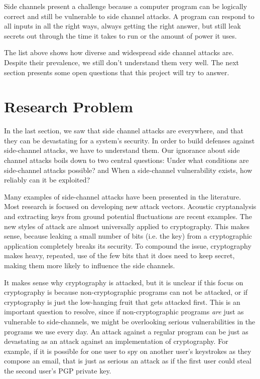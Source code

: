 \documentclass{acm_proc_article-sp}
\begin{document}
Side channels present a challenge because a computer program can be logically
correct and still be vulnerable to side channel attacks. A program can respond
to all inputs in all the right ways, always getting the right answer, but still
leak secrets out through the time it takes to run or the amount of power it
uses.

The list above shows how diverse and widespread side channel attacks are.
Despite their prevalence, we still don't understand them very well. The next
section presents some open questions that this project will try to answer.

\section{Research Problem}
\label{sec:problem}

In the last section, we saw that side channel attacks are everywhere, and that
they can be devastating for a system's security. In order to build defenses
against side-channel attacks, we have to understand them. Our ignorance about
side channel attacks boils down to two central questions: Under what conditions
are side-channel attacks possible? and When a side-channel vulnerability exists,
how reliably can it be exploited?

Many examples of side-channel attacks have been presented in the literature.
Most research is focused on developing new attack vectors. Acoustic
cryptanalysis \cite{genkin2013rsa} and extracting keys from ground potential
fluctuations \cite{genkin2014get} are recent examples. The new styles of attack
are almost universally applied to cryptography. This makes sense, because
leaking a small number of bits (i.e. the key) from a cryptographic application
completely breaks its security. To compound the issue, cryptography makes heavy,
repeated, use of the few bits that it does need to keep secret, making them more
likely to influence the side channels.

It makes sense why cryptography is attacked, but it is unclear if this focus on
cryptography is because non-cryptographic programs can not be attacked, or if
cryptography is just the low-hanging fruit that gets attacked first. This is an
important question to resolve, since if non-cryptographic programs \emph{are}
just as vulnerable to side-channels, we might be overlooking serious
vulnerabilities in the programs we use every day. An attack against a regular
program can be just as devastating as an attack against an implementation of
cryptography. For example, if it is possible for one user to spy on another
user's keystrokes as they compose an email, that is just as serious an attack as
if the first user could steal the second user's PGP private key.
\end{document}

